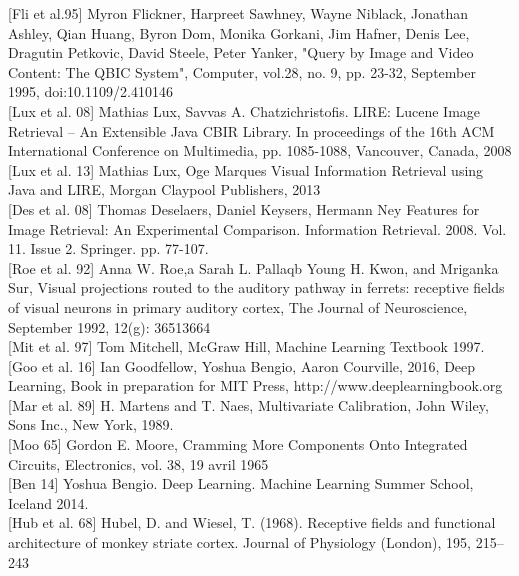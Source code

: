 [Fli et al.95] Myron Flickner, Harpreet Sawhney, Wayne Niblack, Jonathan Ashley, Qian Huang, Byron Dom, Monika Gorkani, Jim Hafner, Denis Lee, Dragutin Petkovic, David Steele, Peter Yanker, "Query by Image and Video Content: The QBIC System", Computer, vol.28, no. 9, pp. 23-32, September 1995, doi:10.1109/2.410146\\

[Lux et al. 08] Mathias Lux, Savvas A. Chatzichristofis. LIRE: Lucene Image Retrieval – An Extensible Java CBIR Library. In proceedings of the 16th ACM International Conference on Multimedia, pp. 1085-1088, Vancouver, Canada, 2008\\

[Lux et al. 13] Mathias Lux, Oge Marques Visual Information Retrieval using Java and LIRE, Morgan Claypool Publishers, 2013\\

[Des et al. 08] Thomas Deselaers, Daniel Keysers, Hermann Ney Features for Image Retrieval: An Experimental Comparison. Information Retrieval. 2008. Vol. 11. Issue 2. Springer. pp. 77-107.\\

[Roe et al. 92] Anna W. Roe,a Sarah L. Pallaqb Young H. Kwon, and Mriganka Sur, Visual projections routed to the auditory pathway in ferrets: receptive fields of visual neurons in primary auditory cortex, The Journal of Neuroscience, September 1992, 12(g): 36513664\\

[Mit et al. 97] Tom Mitchell, McGraw Hill, Machine Learning Textbook 1997.\\

[Goo et al. 16] Ian Goodfellow, Yoshua Bengio, Aaron Courville, 2016, Deep Learning, Book in preparation for MIT Press, http://www.deeplearningbook.org\\

[Mar et al. 89] H. Martens and T. Naes, Multivariate Calibration, John Wiley, Sons Inc., New York, 1989.\\

[Moo 65] Gordon E. Moore, Cramming More Components Onto Integrated Circuits, Electronics, vol. 38,‎ 19 avril 1965\\

[Ben 14] Yoshua Bengio. Deep Learning. Machine Learning Summer School, Iceland 2014.\\

[Hub et al. 68] Hubel, D. and Wiesel, T. (1968). Receptive fields and functional architecture of monkey striate cortex. Journal of Physiology (London), 195, 215–243\\

